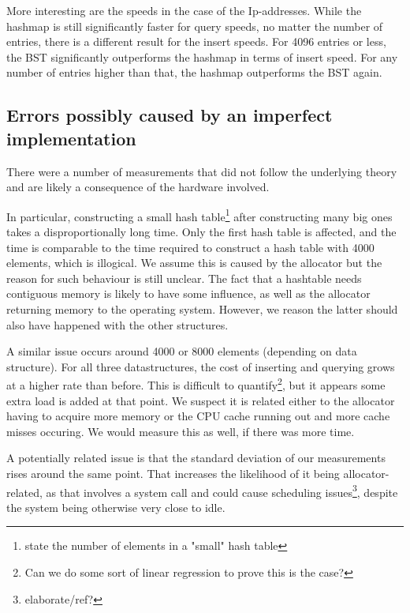 \documentclass[12pt,a4paper]{article}
\begin{document}
    More interesting are the speeds in the case of the Ip-addresses. While the hashmap is still significantly faster 
    for query speeds, no matter the number of entries, there is a different result for the insert speeds. For 4096
    entries or less, the BST significantly outperforms the hashmap in terms of insert speed. For any number of 
    entries higher than that, the hashmap outperforms the BST again. 

    
    

    \subsection{Errors possibly caused by an imperfect implementation}

    There were a number of measurements that did not follow the underlying theory and are likely a
    consequence of the hardware involved.

    In particular, constructing a small hash table\footnote{state the number of elements in a
    "small" hash table} after constructing many big ones takes a disproportionally long time.  Only
    the first hash table is affected, and the time is comparable to the time required to construct a
    hash table with 4000 elements, which is illogical.  We assume this is caused by the allocator
    but the reason for such behaviour is still unclear.  The fact that a hashtable needs contiguous
    memory is likely to have some influence, as well as the allocator returning memory to the
    operating system.  However, we reason the latter should also have happened with the other
    structures.

    A similar issue occurs around 4000 or 8000 elements (depending on data structure).  For all
    three datastructures, the cost of inserting and querying grows at a higher rate than before.
    This is difficult to quantify\footnote{Can we do some sort of linear regression to prove this is
    the case?}, but it appears some extra load is added at that point.  We suspect it is related
    either to the allocator having to acquire more memory or the CPU cache running out and more
    cache misses occuring.  We would measure this as well, if there was more time.

    A potentially related issue is that the standard deviation of our measurements rises around the
    same point.  That increases the likelihood of it being allocator-related, as that involves a
    system call and could cause scheduling issues\footnote{elaborate/ref?}, despite the system being
    otherwise very close to idle.
\end{document}
